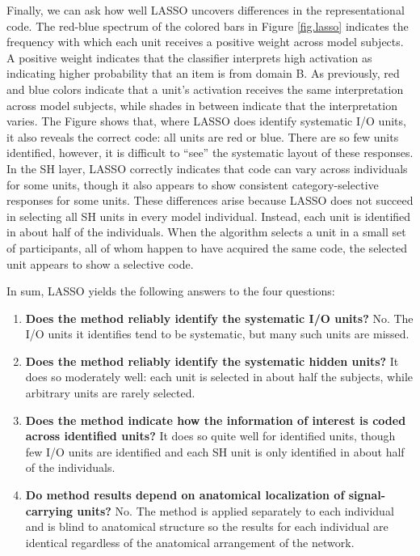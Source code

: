 Finally, we can ask how well LASSO uncovers differences in the representational code. The red-blue spectrum of the colored bars in Figure \ref{fig.lasso} indicates the frequency with which each unit receives a positive weight across model subjects. A positive weight indicates that the classifier interprets high activation as indicating higher probability that an item is from domain B. As previously, red and blue colors indicate that a unit's activation receives the same interpretation across model subjects, while shades in between indicate that the interpretation varies. The Figure shows that, where LASSO does identify systematic I/O units, it also reveals the correct code: all units are red or blue. There are so few units identified, however, it is difficult to ``see'' the systematic layout of these responses. In the SH layer, LASSO correctly indicates that code can vary across individuals for some units, though it also appears to show consistent category-selective responses for some units. These differences arise because LASSO does not succeed in selecting all SH units in every model individual. Instead, each unit is identified in about half of the individuals. When the algorithm selects a unit in a small set of participants, all of whom happen to have acquired the same code, the selected unit appears to show a selective code.

In sum, LASSO yields the following answers to the four questions:
\begin{enumerate}
\item {\bf Does the method reliably identify the systematic I/O units?} No. The I/O units it identifies tend to be systematic, but many such units are missed.
\item {\bf Does the method reliably identify the systematic hidden units?} It does so moderately well: each unit is selected in about half the subjects, while arbitrary units are rarely selected.
\item {\bf Does the method indicate how the information of interest is coded across identified units?} It does so quite well for identified units, though few I/O units are identified and each SH unit is only identified in about half of the individuals.
\item {\bf Do method results depend on anatomical localization of signal-carrying units?} No. The method is applied separately to each individual and is blind to anatomical structure so the results for each individual are identical regardless of the anatomical arrangement of the network.
\end{enumerate}

